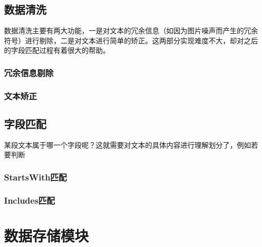 \subsection{数据清洗}
数据清洗主要有两大功能，一是对文本的冗余信息（如因为图片噪声而产生的冗余符号）进行剔除，二是对文本进行简单的矫正。这两部分实现难度不大，却对之后的字段匹配过程有着很大的帮助。
\subsubsection{冗余信息剔除}
\subsubsection{文本矫正}


\subsection{字段匹配}
某段文本属于哪一个字段呢？这就需要对文本的具体内容进行理解划分了，例如若要判断
\subsubsection{StartsWith匹配}
\subsubsection{Includes匹配}
	

\section{数据存储模块} %
